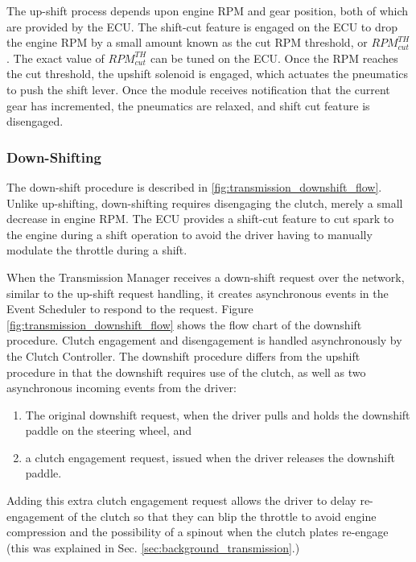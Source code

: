 The up-shift process depends upon engine RPM and gear position, both of which are provided by the ECU. The shift-cut feature is engaged on the ECU to drop the engine RPM by a small amount known as the cut RPM threshold, or $RPM^{TH}_{cut}$. The exact value of $RPM^{TH}_{cut}$ can be tuned on the ECU. Once the RPM reaches the cut threshold, the upshift solenoid is engaged, which actuates the pneumatics to push the shift lever. Once the module receives notification that the current gear has incremented, the pneumatics are relaxed, and shift cut feature is disengaged.


\subsubsection{Down-Shifting}

The down-shift procedure is described in \ref{fig:transmission_downshift_flow}. Unlike up-shifting, down-shifting requires disengaging the clutch, merely a small decrease in engine RPM. The ECU provides a shift-cut feature to cut spark to the engine during a shift operation to avoid the driver having to manually modulate the throttle during a shift.

When the Transmission Manager receives a down-shift request over the network, similar to the up-shift request handling, it creates asynchronous events in the Event Scheduler to respond to the request. Figure \ref{fig:transmission_downshift_flow} shows the flow chart of the downshift procedure. Clutch engagement and disengagement is handled asynchronously by the Clutch Controller. The downshift procedure differs from the upshift procedure in that the downshift requires use of the clutch, as well as two asynchronous incoming events from the driver:

\begin{enumerate}
  \item The original downshift request, when the driver pulls and holds the downshift paddle on the steering wheel, and
  \item a clutch engagement request, issued when the driver releases the downshift paddle.
\end{enumerate}

Adding this extra clutch engagement request allows the driver to delay re-engagement of the clutch so that they can blip the throttle to avoid engine compression and the possibility of a spinout when the clutch plates re-engage (this was explained in Sec. \ref{sec:background_transmission}.)

